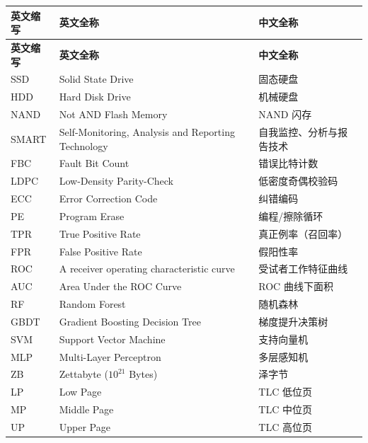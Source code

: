 \cleardoublepage
{}
\begin{center}
    \begin{longtable}{m{2cm}m{8cm}m{5cm}}
        \toprule
        \textbf{英文缩写}&\textbf{英文全称}&\textbf{中文全称}\\
        \midrule
        \endfirsthead
        \toprule
        \textbf{英文缩写}&\textbf{英文全称}&\textbf{中文全称}\\
        \midrule
        \endhead 
        \bottomrule
        \endfoot
        \bottomrule
        \endlastfoot
        SSD&Solid State Drive&固态硬盘\\
        HDD&Hard Disk Drive&机械硬盘\\
        NAND &Not AND Flash Memory&NAND 闪存\\
        SMART&Self-Monitoring, Analysis and Reporting \newline Technology&自我监控、分析与报告技术\\
        FBC&Fault Bit Count&错误比特计数\\
        LDPC&Low-Density Parity-Check&低密度奇偶校验码\\
        ECC&Error Correction Code&纠错编码\\
        PE&Program Erase&编程/擦除循环\\
        TPR&True Positive Rate&真正例率（召回率）\\
        FPR&False Positive Rate&假阳性率\\
        ROC&A receiver operating characteristic curve&受试者工作特征曲线\\
        AUC&Area Under the ROC Curve&ROC 曲线下面积\\
        RF&Random Forest&随机森林\\
        GBDT&Gradient Boosting Decision Tree&梯度提升决策树\\
        SVM&Support Vector Machine&支持向量机\\
        MLP&Multi-Layer Perceptron&多层感知机\\
        ZB&Zettabyte ($10^{21}$ Bytes)&泽字节\\
        LP&Low Page&TLC 低位页\\
        MP&Middle Page&TLC 中位页\\
        UP&Upper Page&TLC 高位页\\
	\end{longtable}
\end{center}